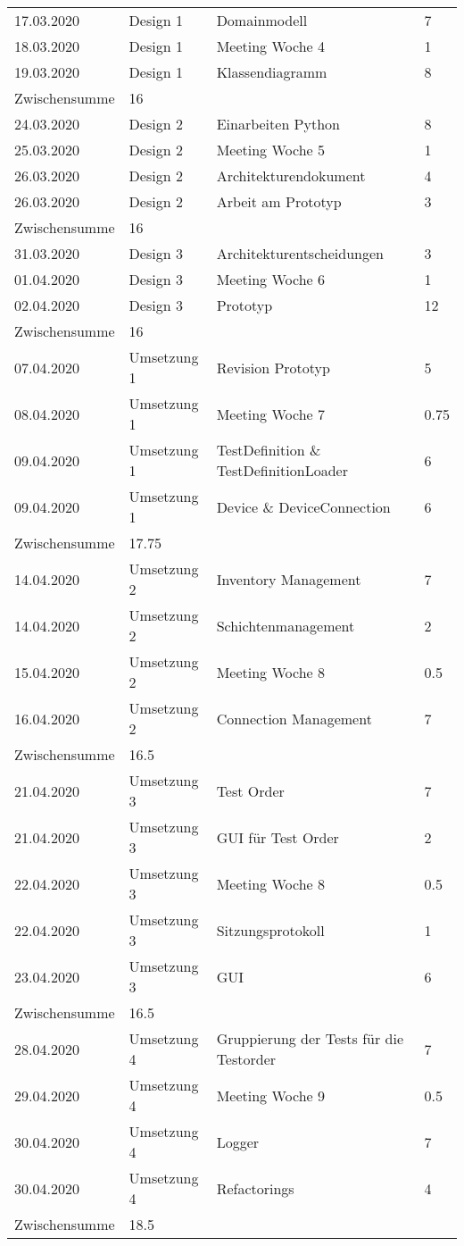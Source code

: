 \documentclass[
	ngerman,
	toc=listof, %
	toc=bibliography, %
	footnotes=multiple, %
	parskip=half, %
	numbers=noendperiod %
]{scrartcl}
\begin{document}
	\begin{tabularx}{\textwidth}{llXl}
		\toprule
		17.03.2020 & Design 1 & Domainmodell & 7 \\
		18.03.2020 & Design 1 & Meeting Woche 4 & 1 \\
		19.03.2020 & Design 1 & Klassendiagramm & 8 \\
		\midrule
		Zwischensumme & 16 & & \\
		\midrule
		24.03.2020 & Design 2 & Einarbeiten Python & 8 \\
		25.03.2020 & Design 2 & Meeting Woche 5 & 1 \\
		26.03.2020 & Design 2 & Architekturendokument & 4 \\
		26.03.2020 & Design 2 & Arbeit am Prototyp & 3 \\
		\midrule
		Zwischensumme & 16 & & \\
		\midrule
		31.03.2020 & Design 3 & Architekturentscheidungen & 3 \\
		01.04.2020 & Design 3 & Meeting Woche 6 & 1 \\
		02.04.2020 & Design 3 & Prototyp & 12 \\
		\midrule
		Zwischensumme & 16 & & \\
		\midrule
		07.04.2020 & Umsetzung 1 & Revision Prototyp & 5 \\
		08.04.2020 & Umsetzung 1 & Meeting Woche 7 & 0.75 \\
		09.04.2020 & Umsetzung 1 & TestDefinition \& TestDefinitionLoader & 6 \\
		09.04.2020 & Umsetzung 1 & Device \& DeviceConnection & 6 \\
		\midrule
		Zwischensumme & 17.75 & & \\
		\midrule
		14.04.2020 & Umsetzung 2 & Inventory Management & 7 \\
		14.04.2020 & Umsetzung 2 & Schichtenmanagement & 2 \\
		15.04.2020 & Umsetzung 2 & Meeting Woche 8 & 0.5 \\
		16.04.2020 & Umsetzung 2 & Connection Management & 7 \\
		\midrule
		Zwischensumme & 16.5 & & \\
		\midrule
		21.04.2020 & Umsetzung 3 & Test Order & 7 \\
		21.04.2020 & Umsetzung 3 & GUI für Test Order & 2 \\
		22.04.2020 & Umsetzung 3 & Meeting Woche 8 & 0.5 \\
		22.04.2020 & Umsetzung 3 & Sitzungsprotokoll & 1 \\
		23.04.2020 & Umsetzung 3 & GUI & 6 \\
		\midrule
		Zwischensumme & 16.5 & & \\
		\midrule 
		28.04.2020 & Umsetzung 4 & Gruppierung der Tests für die Testorder & 7 \\
		29.04.2020 & Umsetzung 4 & Meeting Woche 9 & 0.5 \\
		30.04.2020 & Umsetzung 4 & Logger & 7 \\
		30.04.2020 & Umsetzung 4 & Refactorings & 4 \\
		\midrule
		Zwischensumme & 18.5 & & \\
		\bottomrule
	\end{tabularx}
\end{document}
